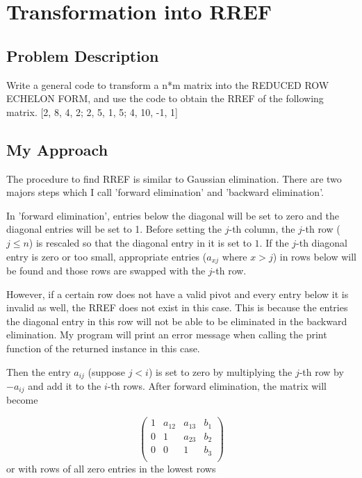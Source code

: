 \documentclass{article}
\begin{document}
\section{Transformation into RREF}

\subsection{Problem Description}
Write a general code to transform a n*m matrix into the REDUCED ROW ECHELON FORM, and use the code to obtain the RREF of the following matrix. [2, 8, 4, 2; 2, 5, 1, 5; 4, 10, -1, 1]

\subsection{My Approach}
The procedure to find RREF is similar to Gaussian elimination. There are two majors steps which I call 'forward elimination' and 'backward elimination'.\par
In 'forward elimination', entries below the diagonal will be set to zero and the diagonal entries will be set to 1. Before setting the $j$-th column, the $j$-th row ($j\le n$) is rescaled so that the diagonal entry in it is set to $1$. 
If the $j$-th diagonal entry is zero or too small, appropriate entries ($a_{xj}$ where $x>j$) in rows below will be found and those rows are swapped with the $j$-th row. 
\par
However, if a certain row does not have a valid pivot and every entry below it is invalid as well, the RREF does not exist in this case. This is because the entries the diagonal entry in this row will not be able to be eliminated in the backward elimination. My program will print an error message when calling the print function of the returned instance in this case.
\par
Then the entry $a_{ij}$ (suppose $j<i$) is set to zero by multiplying the $j$-th row by $-a_{ij}$ and add it to the $i$-th rows.
After forward elimination, the matrix will become\par
\begin{equation}
    \begin{pmatrix}
        1 & a_{12} & a_{13} & b_1 \\
        0 & 1 & a_{23} & b_2 \\
        0 & 0 & 1 & b_3 \\
    \end{pmatrix}
\end{equation}
or with rows of all zero entries in the lowest rows
\end{document}
